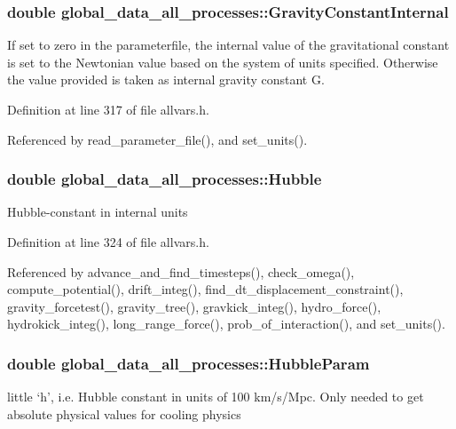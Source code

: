 \hypertarget{structglobal__data__all__processes_a3ebe48dc90c65aa0ed7ddfe8431987b1}{
\subsubsection[{GravityConstantInternal}]{\setlength{\rightskip}{0pt plus 5cm}double {\bf global\_\-data\_\-all\_\-processes::GravityConstantInternal}}}
\label{structglobal__data__all__processes_a3ebe48dc90c65aa0ed7ddfe8431987b1}
If set to zero in the parameterfile, the internal value of the gravitational constant is set to the Newtonian value based on the system of units specified. Otherwise the value provided is taken as internal gravity constant G. 

Definition at line 317 of file allvars.h.



Referenced by read\_\-parameter\_\-file(), and set\_\-units().

\hypertarget{structglobal__data__all__processes_a6e6a37250907d90a56f92a55aefdda5f}{
\subsubsection[{Hubble}]{\setlength{\rightskip}{0pt plus 5cm}double {\bf global\_\-data\_\-all\_\-processes::Hubble}}}
\label{structglobal__data__all__processes_a6e6a37250907d90a56f92a55aefdda5f}
Hubble-\/constant in internal units 

Definition at line 324 of file allvars.h.



Referenced by advance\_\-and\_\-find\_\-timesteps(), check\_\-omega(), compute\_\-potential(), drift\_\-integ(), find\_\-dt\_\-displacement\_\-constraint(), gravity\_\-forcetest(), gravity\_\-tree(), gravkick\_\-integ(), hydro\_\-force(), hydrokick\_\-integ(), long\_\-range\_\-force(), prob\_\-of\_\-interaction(), and set\_\-units().

\hypertarget{structglobal__data__all__processes_a51f2bde6feb49841d60397964a9740ac}{
\subsubsection[{HubbleParam}]{\setlength{\rightskip}{0pt plus 5cm}double {\bf global\_\-data\_\-all\_\-processes::HubbleParam}}}
\label{structglobal__data__all__processes_a51f2bde6feb49841d60397964a9740ac}
little `h', i.e. Hubble constant in units of 100 km/s/Mpc. Only needed to get absolute physical values for cooling physics 


